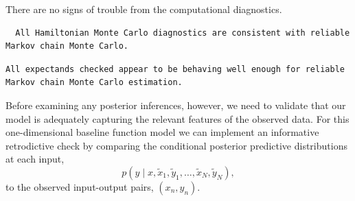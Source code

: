 \documentclass[
  letterpaper,
  DIV=11,
  numbers=noendperiod]{scrartcl}
\newenvironment{Shaded}{\begin{snugshade}}{\end{snugshade}}
\newcommand{\FunctionTok}[1]{\textcolor[rgb]{0.28,0.35,0.67}{#1}}
\newcommand{\NormalTok}[1]{\textcolor[rgb]{0.00,0.23,0.31}{#1}}
\newcommand{\OtherTok}[1]{\textcolor[rgb]{0.00,0.23,0.31}{#1}}
\newcommand{\SpecialCharTok}[1]{\textcolor[rgb]{0.37,0.37,0.37}{#1}}
\newcommand{\StringTok}[1]{\textcolor[rgb]{0.13,0.47,0.30}{#1}}
\begin{document}
There are no signs of trouble from the computational diagnostics.

\begin{Shaded}
\end{Shaded}

\begin{verbatim}
  All Hamiltonian Monte Carlo diagnostics are consistent with reliable
Markov chain Monte Carlo.
\end{verbatim}

\begin{Shaded}
\end{Shaded}

\begin{verbatim}
All expectands checked appear to be behaving well enough for reliable
Markov chain Monte Carlo estimation.
\end{verbatim}

Before examining any posterior inferences, however, we need to validate
that our model is adequately capturing the relevant features of the
observed data. For this one-dimensional baseline function model we can
implement an informative retrodictive check by comparing the conditional
posterior predictive distributions at each input, \[
p(y \mid x,
         \tilde{x}_{1}, \tilde{y}_{1}, \ldots, \tilde{x}_{N}, \tilde{y}_{N}),
\] to the observed input-output pairs, \((x_{n}, y_{n})\).
\end{document}
